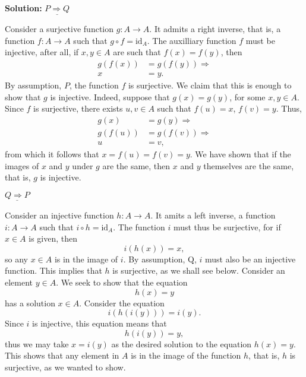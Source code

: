 \documentclass[12pt,oneside]{exam}
\newenvironment{newsolution}{\vspace{.1in}\noindent\textbf{Solution: \hspace{.05em}}}{}
\newcommand{\func}[3]{{#1} : {#2} \longrightarrow {#3}}
\begin{document}
\begin{newsolution}
$\underline{P \Rightarrow Q}$

Consider a surjective function $\func{g}{A}{A}$. It admits a right inverse, that is, a function $\func{f}{A}{A}$ such that $g \circ f = \textrm{id}_{A}$. The auxilliary function $f$ must be injective, after all, if $x,y \in A$ are such that $f(x)=f(y)$, then 
\begin{align*}
g(f(x)) & =g(f(y)) \Rightarrow \\
x & = y.
\end{align*}
By assumption, $P$, the function $f$ is surjective. We claim that this is enough to show that $g$ is injective. Indeed, suppose that $g(x)=g(y)$, for some $x,y \in A$. Since $f$ is surjective, there exists $u,v \in A$ such that $f(u)=x$, $f(v)=y$. Thus, 
\begin{align*}
g(x) & = g(y) \Rightarrow \\
g(f(u)) & = g(f(v)) \Rightarrow\\
u & = v,
\end{align*}
from which it follows that $x=f(u)=f(v)=y$. We have shown that if the images of $x$ and $y$ under $g$ are the same, then $x$ and $y$ themselves are the same, that is, $g$ is injective. 

$\underline{Q \Rightarrow P}$

Consider an injective function $\func{h}{A}{A}$. It amits a left inverse, a function $\func{i}{A}{A}$ such that $i \circ h=\textrm{id}_{A}$. The function $i$ must thus be surjective, for if $x \in A$ is given, then 
\begin{equation*}
i(h(x))=x,
\end{equation*}
so any $x \in A$ is in the image of $i$. By assumption, Q, $i$ must also be an injective function. This implies that $h$ is surjective, as we shall see below. Consider an element $y \in A$. We seek to show that the equation 
\begin{equation*}
h(x)=y
\end{equation*}
has a solution $x \in A$. Consider the equation
\begin{equation*}
i(h(i(y))) = i(y).
\end{equation*}
Since $i$ is injective, this equation means that 
\begin{equation*}
h(i(y))=y,
\end{equation*}
thus we may take $x=i(y)$ as the desired solution to the equation $h(x)=y$. This shows that any element in $A$ is in the image of the function $h$, that is, $h$ is surjective, as we wanted to show. 
\end{newsolution}
\end{document}
